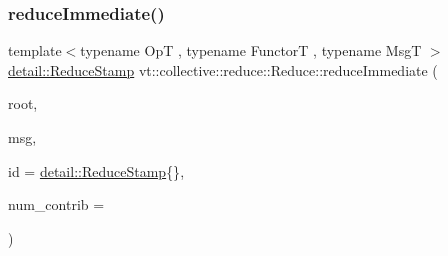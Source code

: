 \subsubsection{\texorpdfstring{reduce\+Immediate()}{reduceImmediate()}\hspace{0.1cm}{\footnotesize\ttfamily [7/8]}}
{\footnotesize\ttfamily template$<$typename OpT , typename FunctorT , typename MsgT $>$ \\
\hyperlink{namespacevt_1_1collective_1_1reduce_1_1detail_aacc1fcd729d934ba143fee3a943bf9e7}{detail\+::\+Reduce\+Stamp} vt\+::collective\+::reduce\+::\+Reduce\+::reduce\+Immediate (\begin{DoxyParamCaption}\item[{\hyperlink{namespacevt_a866da9d0efc19c0a1ce79e9e492f47e2}{Node\+Type} const \&}]{root,  }\item[{MsgT $\ast$}]{msg,  }\item[{\hyperlink{namespacevt_1_1collective_1_1reduce_1_1detail_aacc1fcd729d934ba143fee3a943bf9e7}{detail\+::\+Reduce\+Stamp}}]{id = {\ttfamily \hyperlink{namespacevt_1_1collective_1_1reduce_1_1detail_aacc1fcd729d934ba143fee3a943bf9e7}{detail\+::\+Reduce\+Stamp}\{\}},  }\item[{\hyperlink{structvt_1_1collective_1_1reduce_1_1_reduce_a6c3e63aca10c31d2823b0b18cf9762a4}{Reduce\+Num\+Type} const \&}]{num\+\_\+contrib = {} }\end{DoxyParamCaption})\hspace{0.3cm}{\ttfamily [inline]}}

\mbox{\label{structvt_1_1collective_1_1reduce_1_1_reduce_ad5b5b32dbde405974970f5bdbd24d5d9}} 
